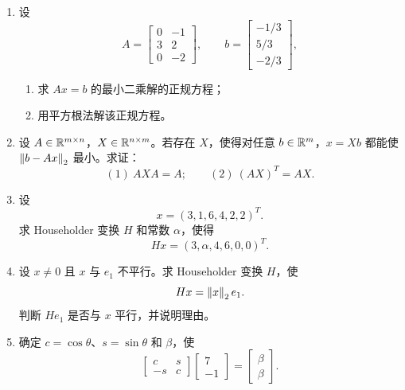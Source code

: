 \documentclass{article}
\begin{document}
\begin{enumerate}
  \item 设
  \[
    A=\begin{bmatrix}0&-1\\3&2\\0&-2\end{bmatrix},\qquad
    b=\begin{bmatrix}-1/3\\5/3\\-2/3\end{bmatrix},
  \]
  \begin{enumerate}[(1)]
    \item 求 $Ax=b$ 的最小二乘解的正规方程；
    \item 用平方根法解该正规方程。
  \end{enumerate}

  \item 设 $A\in\mathbb{R}^{m\times n}$，$X\in\mathbb{R}^{n\times m}$。若存在 $X$，使得对任意
  $b\in\mathbb{R}^m$，$x=Xb$ 都能使 $\left\| b-Ax \right\|_2$ 最小。求证：
  \[
    (1)\ AXA=A;\qquad (2)\ (AX)^T=AX.
  \]

  \item 设
  \[
    x=(3,1,6,4,2,2)^T.
  \]
  求 Householder 变换 $H$ 和常数 $\alpha$，使得
  \[
    Hx=(3,\alpha,4,6,0,0)^T.
  \]

  \item 设 $x\ne0$ 且 $x$ 与 $e_1$ 不平行。求 Householder 变换 $H$，使
  \[
    Hx=\left\| x \right\|_2e_1.
  \]
  判断 $He_1$ 是否与 $x$ 平行，并说明理由。

  \item 确定 $c=\cos\theta$、$s=\sin\theta$ 和 $\beta$，使
  \[
    \begin{bmatrix}c&s\\-s&c\end{bmatrix}
    \begin{bmatrix}7\\-1\end{bmatrix}
    =
    \begin{bmatrix}\beta\\\beta\end{bmatrix}.
  \]


\end{enumerate}
\end{document}
